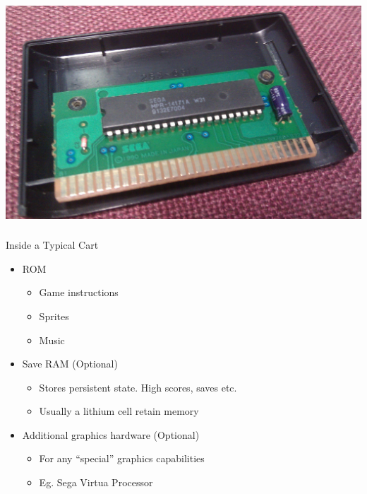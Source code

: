 \documentclass{beamer}
\begin{document}
\begin{frame}[fragile]
\frametitle{\insertsubsection}

\begin{center}
\includegraphics[height=0.7\textheight]{img/inside_cart.jpg}
\end{center}

\end{frame}


\begin{frame}[fragile]

\frametitle{\insertsubsection}

\begin{block}{Inside a Typical Cart}
\begin{itemize}
\item ROM
\begin{itemize}
\item Game instructions
\item Sprites
\item Music
\end{itemize}
\vfill

\item Save RAM (Optional)
\begin{itemize}
\item Stores persistent state. High scores, saves etc.
\item Usually a lithium cell retain memory
\end{itemize}
\vfill

\item Additional graphics hardware (Optional)
\begin{itemize}
\item For any ``special'' graphics capabilities
\item Eg. Sega Virtua Processor
\end{itemize}
\end{itemize}
\end{block}

\end{frame}
\end{document}
